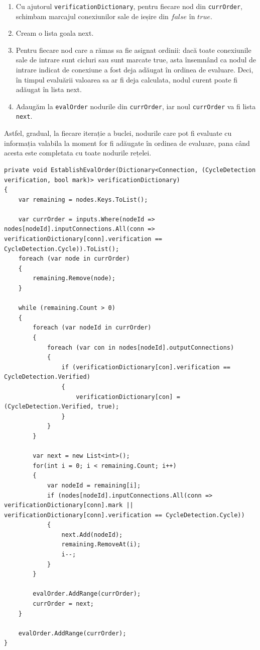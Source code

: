 \begin{enumerate}
    \item Cu ajutorul \texttt{verification\-Dictionary}, pentru fiecare nod din \texttt{curr\-Order}, schimbam marcajul conexiunilor sale de ieșire din $false$ în $true$.
    \item Cream o lista goala next.
    \item Pentru fiecare nod care a rămas sa fie asignat ordinii: dacă toate conexiunile sale de intrare sunt cicluri sau sunt marcate true, asta însemnând ca nodul de intrare indicat de conexiune a fost deja adăugat în ordinea de evaluare. Deci, în timpul evaluării valoarea sa ar fi deja calculata, nodul curent poate fi adăugat în lista next.
    \item Adaugăm la \texttt{eval\-Order} nodurile din \texttt{curr\-Order}, iar noul \texttt{curr\-Order} va fi lista \texttt{next}.
\end{enumerate}
Astfel, gradual, la fiecare iterație a buclei, nodurile care pot fi evaluate cu informația valabila la moment for fi adăugate în ordinea de evaluare, pana când acesta este completata cu toate nodurile rețelei.

\begin{lstlisting}[caption={Functia de determinare a ordinii de evaluare a nodurilor}, label={lst:EstablishEvalOrder}]
private void EstablishEvalOrder(Dictionary<Connection, (CycleDetection verification, bool mark)> verificationDictionary)
{
    var remaining = nodes.Keys.ToList();

    var currOrder = inputs.Where(nodeId => nodes[nodeId].inputConnections.All(conn => verificationDictionary[conn].verification == CycleDetection.Cycle)).ToList();
    foreach (var node in currOrder)
    {
        remaining.Remove(node);
    }

    while (remaining.Count > 0)
    {
        foreach (var nodeId in currOrder)
        {
            foreach (var con in nodes[nodeId].outputConnections)
            {
                if (verificationDictionary[con].verification == CycleDetection.Verified)
                {
                    verificationDictionary[con] = (CycleDetection.Verified, true);
                }
            }
        }

        var next = new List<int>();
        for(int i = 0; i < remaining.Count; i++)
        {
            var nodeId = remaining[i];
            if (nodes[nodeId].inputConnections.All(conn => verificationDictionary[conn].mark || verificationDictionary[conn].verification == CycleDetection.Cycle))
            {
                next.Add(nodeId);
                remaining.RemoveAt(i);
                i--;
            }
        }

        evalOrder.AddRange(currOrder);
        currOrder = next;
    }

    evalOrder.AddRange(currOrder);
}
\end{lstlisting}

